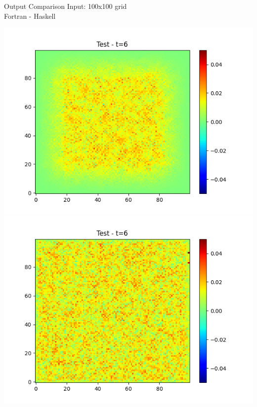 \documentclass{beamer}
\begin{document}
\begin{frame}{Output Comparison}
    Input: 100x100 grid\\
    Fortran - Haskell
    \begin{center}
        \includegraphics[scale=0.32]{figure/frame_6.png}
        \includegraphics[scale=0.32]{figure/frame_2_6.png}
    \end{center}
\end{frame}
\end{document}
